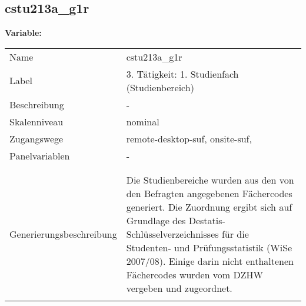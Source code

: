 	
	
	\subsection{cstu213a\_g1r}
	\label{subSection:cstu213a_g1r}

	\noindent\textbf{Variable:}\\
		\begin{tabular}{lL{11.3cm}}
			\label{tableVariable:cstu213a_g1r}
			Name & cstu213a\_g1r \\
			Label & 3. Tätigkeit: 1. Studienfach (Studienbereich) \\
			Beschreibung & - \\
			Skalenniveau & nominal \\
			Zugangswege &
				remote-desktop-suf,
				onsite-suf,
 \\
			Panelvariablen & -
			 \\
			 \\
 \\
					Generierungsbeschreibung & Die Studienbereiche wurden aus den von den Befragten angegebenen Fächercodes generiert. Die Zuordnung ergibt sich auf Grundlage des Destatis-Schlüsselverzeichnisses für die Studenten- und Prüfungsstatistik (WiSe 2007/08). Einige darin nicht enthaltenen Fächercodes wurden vom DZHW vergeben und zugeordnet. 
				 \\	
			 \\
		\end{tabular}






